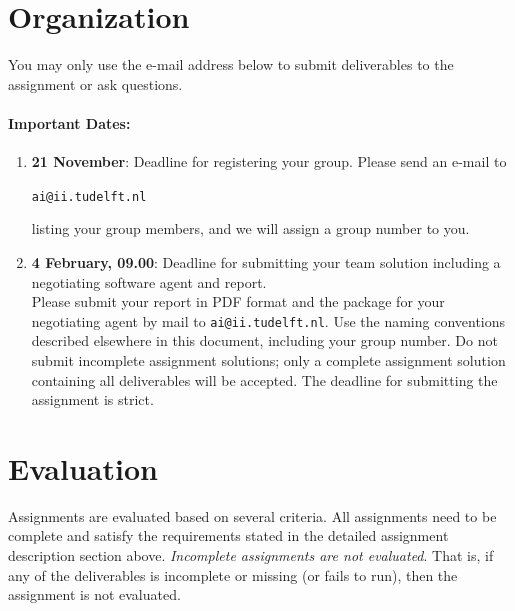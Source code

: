 \documentclass[a4paper]{article}
\newcommand{\groupdate}{21 November}
\newcommand{\deadline}{4 February, 09.00}
\begin{document}
\section{Organization}\label{sec:organization} 

You may only use the e-mail address below to submit deliverables to the assignment or ask questions.
\paragraph{Important Dates:}
\begin{enumerate}
  \item {\bf \groupdate}: Deadline for registering your group. Please send an e-mail to 
  \begin{center}
  \verb+ai@ii.tudelft.nl+
  \end{center}
  listing your group members, and we will assign a group number to you.

\item {\bf \deadline}: Deadline for submitting your team solution including a negotiating software agent and report.\\\break
  Please submit your report in PDF format and the package for your negotiating agent by mail to \texttt{ai@ii.tudelft.nl}. Use the naming conventions described elsewhere in this document, including your group number. Do not submit incomplete assignment solutions; only a complete assignment solution containing all deliverables will be accepted. The deadline for submitting the assignment is strict.
\end{enumerate}



\section{Evaluation}\label{sec:evaluation}

Assignments are evaluated based on several criteria. All assignments need to be complete and satisfy the requirements stated in the detailed assignment description section above. {\em Incomplete assignments are not evaluated}. That is, if any of the deliverables is incomplete or missing (or fails to run), then the assignment is not evaluated.
\end{document}
